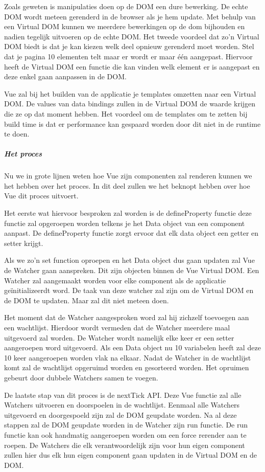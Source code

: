 Zoals geweten is manipulaties doen op de DOM een dure bewerking. De echte DOM wordt meteen gerenderd in de browser als je hem update. Met behulp van een Virtual DOM kunnen we meerdere bewerkingen op de dom bijhouden en nadien tegelijk uitvoeren op de echte DOM. Het tweede voordeel dat zo’n Virtual DOM biedt is dat je kan kiezen welk deel opnieuw gerenderd moet worden. Stel dat je pagina 10 elementen telt maar er wordt er maar één aangepast. Hiervoor heeft de Virtual DOM een functie die kan vinden welk element er is aangepast en deze enkel gaan aanpassen in de DOM.

Vue zal bij het builden van de applicatie je templates omzetten naar een Virtual DOM. De values van data bindings zullen in de Virtual DOM de waarde krijgen die ze op dat moment hebben. Het voordeel om de templates om te zetten bij build time is dat er performance kan gespaard worden door dit niet in de runtime te doen.

\subparagraph{Het proces}
Nu we in grote lijnen weten hoe Vue zijn componenten zal renderen kunnen we het hebben over het proces. In dit deel zullen we het beknopt hebben over hoe Vue dit proces uitvoert.

Het eerste wat hiervoor besproken zal worden is de defineProperty functie deze functie zal opgeroepen worden telkens je het Data object van een component aanpast. De defineProperty functie zorgt ervoor dat elk data object een getter en setter krijgt.

Als we zo’n set function oproepen en het Data object dus gaan updaten zal Vue de Watcher gaan aanspreken. Dit zijn objecten binnen de Vue Virtual DOM. Een Watcher zal aangemaakt worden voor elke component als de applicatie geïnitializeerdt word. De taak van deze watcher zal zijn om de Virtual DOM en de DOM te updaten. Maar zal dit niet meteen doen.

Het moment dat de Watcher aangesproken word zal hij zichzelf toevoegen aan een wachtlijst. Hierdoor wordt vermeden dat de Watcher meerdere maal uitgevoerd zal worden. De Watcher wordt namelijk elke keer er een setter aangeroepen word uitgevoerd. Als een Data object nu 10 variabelen heeft zal deze 10 keer aangeroepen worden vlak na elkaar. Nadat de Watcher in de wachtlijst komt zal de wachtlijst opgeruimd worden en gesorteerd worden. Het opruimen gebeurt door dubbele Watchers samen te voegen.

De laatste stap van dit proces is de nextTick API. Deze Vue functie zal alle Watchers uitvoeren en doorspoelen in de wachtlijst. Eenmaal alle Watchers uitgevoerd en doorgespoeld zijn zal de DOM geupdate worden. Na al deze stappen zal de DOM geupdate worden in de Watcher zijn run functie. De run functie kan ook handmatig aangeroepen worden om een force rerender aan te roepen. De Watchers die elk verantwoordelijk zijn voor hun eigen component zullen hier dus elk hun eigen component gaan updaten in de Virtual DOM en de DOM.


